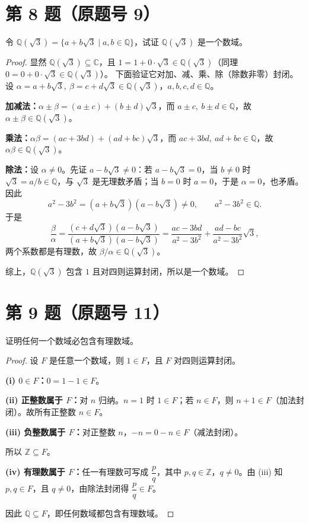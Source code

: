 \documentclass[11pt,a4paper]{ctexart}
\newcommand{\Q}{\mathbb{Q}}
\newenvironment{problem}[1]
  {\par\medskip\noindent\textbf{#1}\quad}
  {\par}
\begin{document}
\section*{第 8 题（原题号 9）}

\begin{problem}{}令 $\Q(\sqrt3)=\{a+b\sqrt3\mid a,b\in\Q\}$，试证 $\Q(\sqrt3)$ 是一个数域。\end{problem}

\begin{proof}
显然 $\Q(\sqrt3)\subseteq\mathbb C$，且 $1=1+0\cdot\sqrt3\in\Q(\sqrt3)$（同理 $0=0+0\cdot\sqrt3\in\Q(\sqrt3)$）。
下面验证它对加、减、乘、除（除数非零）封闭。设 $\alpha=a+b\sqrt3,\ \beta=c+d\sqrt3\in\Q(\sqrt3)$，$a,b,c,d\in\Q$。

\textbf{加减法：}$\alpha\pm\beta=(a\pm c)+(b\pm d)\sqrt3$，而 $a\pm c,\ b\pm d\in\Q$，故 $\alpha\pm\beta\in\Q(\sqrt3)$。

\textbf{乘法：}$\alpha\beta=(ac+3bd)+(ad+bc)\sqrt3$，而 $ac+3bd,\ ad+bc\in\Q$，故 $\alpha\beta\in\Q(\sqrt3)$。

\textbf{除法：}设 $\alpha\ne0$。先证 $a-b\sqrt3\ne0$：若 $a-b\sqrt3=0$，当 $b\ne0$ 时 $\sqrt3=a/b\in\Q$，与 $\sqrt3$ 是无理数矛盾；当 $b=0$ 时 $a=0$，于是 $\alpha=0$，也矛盾。因此
\[
a^2-3b^2=(a+b\sqrt3)(a-b\sqrt3)\ne0,\qquad a^2-3b^2\in\Q.
\]
于是
\[
\frac{\beta}{\alpha}=\frac{(c+d\sqrt3)(a-b\sqrt3)}{(a+b\sqrt3)(a-b\sqrt3)}
=\frac{ac-3bd}{a^2-3b^2}+\frac{ad-bc}{a^2-3b^2}\sqrt3,
\]
两个系数都是有理数，故 $\beta/\alpha\in\Q(\sqrt3)$。

综上，$\Q(\sqrt3)$ 包含 $1$ 且对四则运算封闭，所以是一个数域。
\end{proof}

\section*{第 9 题（原题号 11）}

\begin{problem}{}证明任何一个数域必包含有理数域。\end{problem}

\begin{proof}
设 $F$ 是任意一个数域，则 $1\in F$，且 $F$ 对四则运算封闭。

\textbf{(i) $0\in F$：}$0=1-1\in F$。

\textbf{(ii) 正整数属于 $F$：}对 $n$ 归纳。$n=1$ 时 $1\in F$；若 $n\in F$，则 $n+1\in F$（加法封闭）。故所有正整数 $n\in F$。

\textbf{(iii) 负整数属于 $F$：}对正整数 $n$，$-n=0-n\in F$（减法封闭）。

所以 $\mathbb Z\subseteq F$。

\textbf{(iv) 有理数属于 $F$：}任一有理数可写成 $\dfrac pq$，其中 $p,q\in\mathbb Z$，$q\ne0$。由 (iii) 知 $p,q\in F$，且 $q\ne0$，由除法封闭得 $\dfrac pq\in F$。

因此 $\Q\subseteq F$，即任何数域都包含有理数域。
\end{proof}
\end{document}
